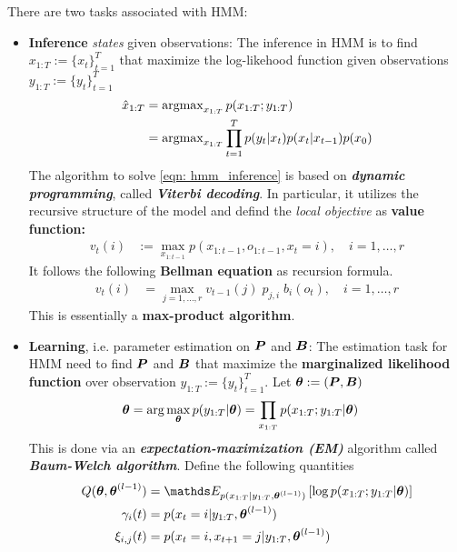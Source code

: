 \documentclass[11pt]{article}
\begin{document}
There are two tasks associated with HMM:
\begin{itemize}
\item \textbf{Inference} \emph{states} given observations: The inference in HMM is to find $x_{1:T}:= \{x_t\}_{t=1}^{T}$  that maximize the log-likehood function given observations $y_{1:T}:= \{y_t\}_{t=1}^{T}$
\begin{align}
\hat{x}_{1:T} &= \operatorname{argmax}_{x_{1:T}}p(x_{1:T} ; y_{1:T}) \nonumber\\
&=\operatorname{argmax}_{x_{1:T}} \prod_{t=1}^{T}p(y_t | x_t)p(x_t| x_{t-1})p(x_{0}) \label{eqn: hmm_inference}
\end{align} The algorithm to solve \eqref{eqn: hmm_inference} is based on \textbf{\emph{dynamic programming}}, called \textbf{\emph{Viterbi decoding}}. In particular, it utilizes the recursive structure of the model and defind the \emph{local objective} as \textbf{value function:}
\begin{align}
v_{t}(i) &:= \max_{x_{1:t-1}} p(x_{1:t-1}, o_{1:t-1}, x_t= i), \quad i =1,\ldots, r  \label{eqn: hmm_inference_value}
\end{align} It follows the following \textbf{Bellman equation} as recursion formula.
\begin{align}
v_{t}(i) &= \max_{j= 1,\ldots, r} v_{t-1}(j)\; p_{j,i}\; b_{i}(o_t), \quad i=1,\ldots, r  \label{eqn: hmm_inference_viterbi}
\end{align} This is essentially a \textbf{max-product algorithm}.

\item \textbf{Learning}, i.e. parameter estimation on $\boldsymbol{P}$ and $\boldsymbol{B}$: The estimation task for HMM need to find $\boldsymbol{P}$ and $\boldsymbol{B}$ that maximize the \textbf{marginalized likelihood function} over observation $y_{1:T}:= \{y_t\}_{t=1}^{T}$. Let $\boldsymbol{\theta}:= (\boldsymbol{P}, \boldsymbol{B})$
\begin{align}
\boldsymbol{\theta} &= \arg\max_{\boldsymbol{\theta}} p(y_{1:T} | \boldsymbol{\theta}) = \prod_{x_{1:T}}p(x_{1:T} ; y_{1:T} | \boldsymbol{\theta})
\end{align}
This is done via an \emph{\textbf{expectation-maximization (EM)}} algorithm called \textbf{\emph{Baum-Welch algorithm}}. Define the following quantities
\begin{align}
Q(\mb{\theta}, \mb{\theta}^{(l-1)}) &= \E{p(x_{1:T} |  y_{1:T}, \mb{\theta}^{(l-1)})}{\log p(x_{1:T} ; y_{1:T} | \mb{\theta})} \label{eqn: hmm_baum_welch_q}\\
\gamma_{i}(t) &= p(x_t = i | y_{1:T}, \mb{\theta}^{(l-1)})   \label{eqn: hmm_baum_welch_gamma}\\
\xi_{i,j}(t) &= p(x_{t} = i, x_{t+1} = j | y_{1:T}, \mb{\theta}^{(l-1)}) \label{eqn: hmm_baum_welch_xi}
\end{align} 


\end{itemize}
\end{document}
